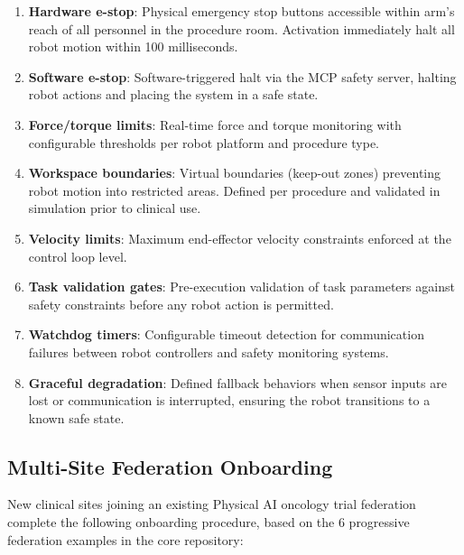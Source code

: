 \documentclass[11pt,letterpaper]{article}
\begin{document}
\begin{enumerate}
  \item \textbf{Hardware e-stop}: Physical emergency stop buttons accessible within arm's reach of all personnel in the procedure room. Activation \SHALL{} immediately halt all robot motion within 100 milliseconds.
  \item \textbf{Software e-stop}: Software-triggered halt via the MCP safety server, halting robot actions and placing the system in a safe state.
  \item \textbf{Force/torque limits}: Real-time force and torque monitoring with configurable thresholds per robot platform and procedure type.
  \item \textbf{Workspace boundaries}: Virtual boundaries (keep-out zones) preventing robot motion into restricted areas. Defined per procedure and validated in simulation prior to clinical use.
  \item \textbf{Velocity limits}: Maximum end-effector velocity constraints enforced at the control loop level.
  \item \textbf{Task validation gates}: Pre-execution validation of task parameters against safety constraints before any robot action is permitted.
  \item \textbf{Watchdog timers}: Configurable timeout detection for communication failures between robot controllers and safety monitoring systems.
  \item \textbf{Graceful degradation}: Defined fallback behaviors when sensor inputs are lost or communication is interrupted, ensuring the robot transitions to a known safe state.
\end{enumerate}

\subsection{Multi-Site Federation Onboarding}

New clinical sites joining an existing Physical AI oncology trial federation \SHALL{} complete the following onboarding procedure, based on the 6 progressive federation examples in the core repository:
\end{document}
